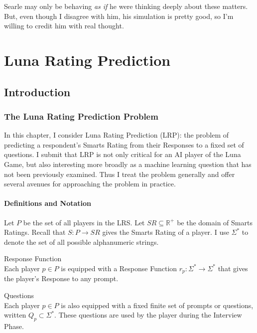 \begin{savequote}[75mm]
Searle may only be behaving \textit{as if} he were thinking deeply about these matters. But, even though I disagree with him, his simulation is pretty good, so I'm willing to credit him with real thought.
\end{savequote}

\chapter{Luna Rating Prediction}

\section{Introduction}
\subsection{The Luna Rating Prediction Problem}
In this chapter, I consider Luna Rating Prediction (LRP): the problem of predicting a respondent's  Smarts Rating from their Responses to a fixed set of questions. I submit that LRP is not only critical for an AI player of the Luna Game, but also interesting more broadly as a machine learning question that has not been previously examined. Thus I treat the problem generally and offer several avenues for approaching the problem in practice.

\subsubsection{Definitions and Notation}
Let $P$ be the set of all players in the LRS. Let $SR \subseteq \mathbb{R}^+$ be the domain of Smarts Ratings. Recall that $S : P \to SR$ gives the Smarts Rating of a player. I use $\Sigma^*$ to denote the set of all possible alphanumeric strings.

\theoremstyle{definition}
\begin{definition}{Response Function}\\
Each player $p \in P$ is equipped with a Response Function $r_p : \Sigma^* \to \Sigma^*$ that gives the player's Response to any prompt.
\end{definition}

\theoremstyle{definition}
\begin{definition}{Questions}\\
Each player $p \in P$ is also equipped with a fixed finite set of prompts or questions, written $Q_p \subset \Sigma^*$. These questions are used by the player during the Interview Phase. 
\end{definition}


